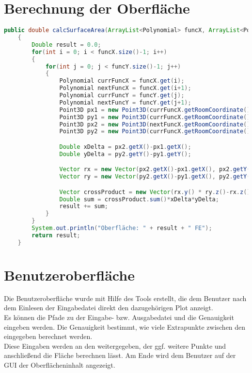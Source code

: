 \documentclass[11pt, bibliography=totocnumbered]{scrartcl}
\begin{document}
\section{Berechnung der Oberfl\"ache}
\begin{lstlisting}[caption={}, label={lst:label}, language=Java]
    public double calcSurfaceArea(ArrayList<Polynomial> funcX, ArrayList<Polynomial> funcY)
    {
        Double result = 0.0;
        for(int i = 0; i < funcX.size()-1; i++)
        {
            for(int j = 0; j < funcY.size()-1; j++)
            {
                Polynomial currFuncX = funcX.get(i);
                Polynomial nextFuncX = funcX.get(i+1);
                Polynomial currFuncY = funcY.get(j);
                Polynomial nextFuncY = funcY.get(j+1);
                Point3D px1 = new Point3D(currFuncX.getRoomCoordinate(), currFuncY.getRoomCoordinate(), currFuncX.derivation(currFuncY.getRoomCoordinate()));
                Point3D py1 = new Point3D(currFuncX.getRoomCoordinate(), currFuncY.getRoomCoordinate(), currFuncY.derivation(currFuncX.getRoomCoordinate()));
                Point3D px2 = new Point3D(nextFuncX.getRoomCoordinate(), currFuncY.getRoomCoordinate(), nextFuncX.derivation(currFuncY.getRoomCoordinate()));
                Point3D py2 = new Point3D(currFuncX.getRoomCoordinate(), nextFuncY.getRoomCoordinate(), nextFuncY.derivation(currFuncX.getRoomCoordinate()));

                Double xDelta = px2.getX()-px1.getX();
                Double yDelta = py2.getY()-py1.getY();

                Vector rx = new Vector(px2.getX()-px1.getX(), px2.getY()-px1.getY(), px2.getZ()-px1.getZ());
                Vector ry = new Vector(py2.getX()-py1.getX(), py2.getY()-py1.getY(), py2.getZ()-py1.getZ());

                Vector crossProduct = new Vector(rx.y() * ry.z()-rx.z()*ry.y(),rx.z()*ry.x()-rx.x()*ry.z(), rx.x()*ry.y()-rx.y()*ry.x());
                Double sum = crossProduct.sum()*xDelta*yDelta;
                result += sum;
            }
        }
        System.out.println("Oberfläche: " + result + " FE");
        return result;
    }
\end{lstlisting}
\section{Benutzeroberfl\"ache}

Die Benutzeroberfl\"ache wurde mit Hilfe des Tools  erstellt, die dem Benutzer nach dem Einlesen der Eingabedatei direkt den dazugeh\"origen Plot anzeigt. \\ 
Es k\"onnen die Pfade zu der Eingabe- bzw. Ausgabedatei und die Genauigkeit eingeben werden. Die Genauigkeit bestimmt, wie viele Extrapunkte zwischen den eingegeben berechnet werden. \\
Diese Eingaben werden an den  weitergegeben, der ggf. weitere Punkte und anschlie{\ss}end die Fl\"ache berechnen l\"asst. Am Ende wird dem Benutzer auf der GUI der Oberfl\"acheninhalt angezeigt. 
\end{document}
